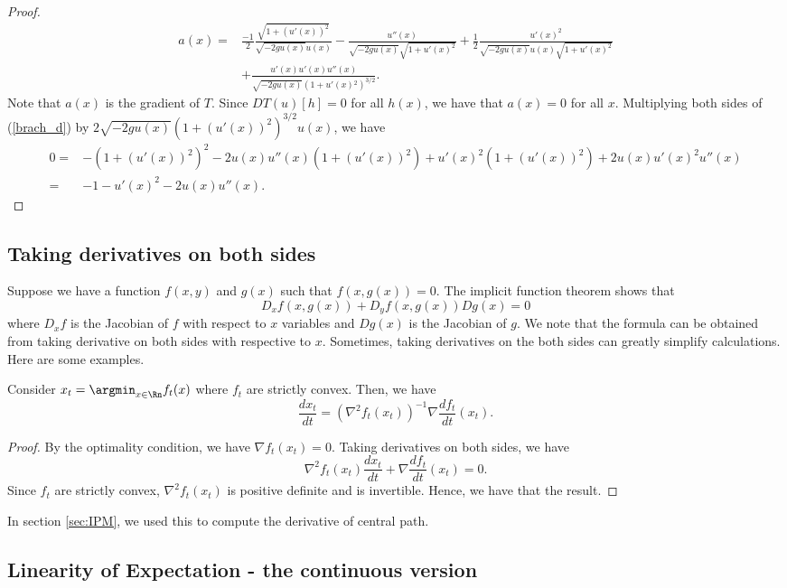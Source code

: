 \begin{proof}
\begin{align}
a(x)= & \frac{-1}{2}\frac{\sqrt{1+(u'(x))^{2}}}{\sqrt{-2gu(x)}u(x)}-\frac{u''(x)}{\sqrt{-2gu(x)}\sqrt{1+u'(x)^{2}}}+\frac{1}{2}\frac{u'(x)^{2}}{\sqrt{-2gu(x)}u(x)\sqrt{1+u'(x)^{2}}}\nonumber \\
 & +\frac{u'(x)u'(x)u''(x)}{\sqrt{-2gu(x)}(1+u'(x){}^{2})^{3/2}}.\label{brach_d}
\end{align}
Note that $a(x)$ is the gradient of $T$. Since $DT(u)[h]=0$ for
all $h(x)$, we have that $a(x)=0$ for all $x$. Multiplying both
sides of (\ref{brach_d}) by $2\sqrt{-2gu(x)}(1+(u'(x))^{2})^{3/2}u(x)$,
we have
\begin{align*}
0= & -(1+(u'(x))^{2})^{2}-2u(x)u''(x)(1+(u'(x))^{2})+u'(x)^{2}(1+(u'(x))^{2})+2u(x)u'(x)^{2}u''(x)\\
= & -1-u'(x)^{2}-2u(x)u''(x).
\end{align*}
\end{proof}

\subsection{Taking derivatives on both sides}

Suppose we have a function $f(x,y)$ and $g(x)$ such that $f(x,g(x))=0$.
The implicit function theorem shows that
\[
D_{x}f(x,g(x))+D_{y}f(x,g(x))Dg(x)=0
\]
where $D_{x}f$ is the Jacobian of $f$ with respect to $x$ variables
and $Dg(x)$ is the Jacobian of $g$. We note that the formula can
be obtained from taking derivative on both sides with respective to
$x$. Sometimes, taking derivatives on the both sides can greatly
simplify calculations. Here are some examples.
\begin{lem}
Consider $x_{t}=\argmin_{x\in\Rn}f_{t}(x)$ where $f_{t}$ are strictly
convex. Then, we have
\[
\frac{dx_{t}}{dt}=(\nabla^{2}f_{t}(x_{t}))^{-1}\nabla\frac{df_{t}}{dt}(x_{t}).
\]
\end{lem}

\begin{proof}
By the optimality condition, we have $\nabla f_{t}(x_{t})=0$. Taking
derivatives on both sides, we have
\[
\nabla^{2}f_{t}(x_{t})\frac{dx_{t}}{dt}+\nabla\frac{df_{t}}{dt}(x_{t})=0.
\]
Since $f_{t}$ are strictly convex, $\nabla^{2}f_{t}(x_{t})$ is positive
definite and is invertible. Hence, we have that the result.
\end{proof}
In section \ref{sec:IPM}, we used this to compute the derivative
of central path.

\subsection{Linearity of Expectation - the continuous version}

